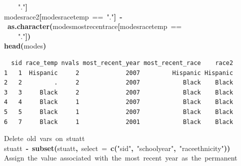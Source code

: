 \documentclass[12pt]{article}
\makeatletter
\newcommand{\hlfunctioncall}[1]{\textcolor[rgb]{0.501960784313725,0,0.329411764705882}{\textbf{#1}}}%
\newcommand{\hlstring}[1]{\textcolor[rgb]{0.6,0.6,1}{#1}}%
\newcommand{\hlkeyword}[1]{\textcolor[rgb]{0,0,0}{\textbf{#1}}}%
\newcommand{\hlargument}[1]{\textcolor[rgb]{0.690196078431373,0.250980392156863,0.0196078431372549}{#1}}%
\newcommand{\hlcomment}[1]{\textcolor[rgb]{0.180392156862745,0.6,0.341176470588235}{#1}}%
\newcommand{\hlassignement}[1]{\textcolor[rgb]{0,0,0}{\textbf{#1}}}%
\newcommand{\hlsymbol}[1]{\textcolor[rgb]{0,0,0}{#1}}%
\newcommand{\hlstd}[1]{\textcolor[rgb]{0,0,0}{#1}}%
\newenvironment{kframe}{%
 \def\FrameCommand##1{\hskip\@totalleftmargin \hskip-\fboxsep
 \colorbox{shadecolor}{##1}\hskip-\fboxsep
     \hskip-\linewidth \hskip-\@totalleftmargin \hskip\columnwidth}%
 \MakeFramed {\advance\hsize-\width
   \@totalleftmargin\z@ \linewidth\hsize
   \@setminipage}}%
 {\par\unskip\endMakeFramed}
\newenvironment{knitrout}{}{} %
\renewenvironment{knitrout}{\begin{footnotesize}}{\end{footnotesize}}
\makeatother
\begin{document}
\begin{knitrout}
\begin{kframe}
\begin{flushleft}
\hlstd{}{\ }{\ }{\ }{\ }\hlstring{"{}."{}}\hlkeyword{]}\hspace*{\fill}\\
\hlstd{}\hlsymbol{modes}\hlkeyword{\usebox{\hlnormalsizeboxdollar}}\hlsymbol{race2}\hlkeyword{[}\hlsymbol{modes}\hlkeyword{\usebox{\hlnormalsizeboxdollar}}\hlsymbol{race\usebox{\hlnormalsizeboxunderscore}temp}{\ }=={\ }\hlstring{"{}."{}}\hlkeyword{]}{\ }\hlassignement{\usebox{\hlnormalsizeboxlessthan}-}{\ }\hlfunctioncall{as.character}\hlkeyword{(}\hlsymbol{modes}\hlkeyword{\usebox{\hlnormalsizeboxdollar}}\hlsymbol{most\usebox{\hlnormalsizeboxunderscore}recent\usebox{\hlnormalsizeboxunderscore}race}\hlkeyword{[}\hlsymbol{modes}\hlkeyword{\usebox{\hlnormalsizeboxdollar}}\hlsymbol{race\usebox{\hlnormalsizeboxunderscore}temp}{\ }==\hspace*{\fill}\\
\hlstd{}{\ }{\ }{\ }{\ }\hlstring{"{}."{}}\hlkeyword{]}\hlkeyword{)}\hspace*{\fill}\\
\hlstd{}\hlfunctioncall{head}\hlkeyword{(}\hlsymbol{modes}\hlkeyword{)}\mbox{}
\normalfont
\end{flushleft}
\begin{verbatim}
  sid race_temp nvals most_recent_year most_recent_race    race2
1   1  Hispanic     2             2007         Hispanic Hispanic
2   2         .     2             2007            Black    Black
3   3     Black     2             2007            Black    Black
4   4     Black     1             2007            Black    Black
5   5     Black     1             2007            Black    Black
6   7     Black     1             2001            Black    Black
\end{verbatim}
\begin{flushleft}
\ttfamily\noindent
\hlcomment{\usebox{\hlnormalsizeboxhash}{\ }Delete{\ }old{\ }vars{\ }on{\ }stuatt}\hspace*{\fill}\\
\hlstd{}\hlsymbol{stuatt}{\ }\hlassignement{\usebox{\hlnormalsizeboxlessthan}-}{\ }\hlfunctioncall{subset}\hlkeyword{(}\hlsymbol{stuatt}\hlkeyword{,}{\ }\hlargument{select}{\ }\hlargument{=}{\ }\hlfunctioncall{c}\hlkeyword{(}\hlstring{"{}sid"{}}\hlkeyword{,}{\ }\hlstring{"{}school\usebox{\hlnormalsizeboxunderscore}year"{}}\hlkeyword{,}{\ }\hlstring{"{}race\usebox{\hlnormalsizeboxunderscore}ethnicity"{}}\hlkeyword{)}\hlkeyword{)}\hspace*{\fill}\\
\hlstd{}\hlcomment{\usebox{\hlnormalsizeboxhash}{\ }Assign{\ }the{\ }value{\ }associated{\ }with{\ }the{\ }most{\ }recent{\ }year{\ }as{\ }the{\ }permanent}\hspace*{\fill}\\

\end{flushleft}
\end{kframe}
\end{knitrout}
\end{document}

